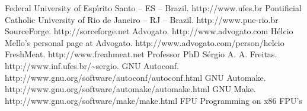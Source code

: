 \documentclass[a4paper,draft,12pt]{book}
\begin{document}
\begin{thebibliography}{12}
 Federal University of Esp\'{\i}rito Santo -- ES -- Brazil.
http://www.ufes.br
 Pontificial Catholic University of Rio de Janeiro -- RJ
-- Brazil. http://www.puc-rio.br
 SourceForge. http://sorceforge.net
Advogato. http://www.advogato.com
H\'elcio Mello's personal page at Advogato.
http://www.advogato.com/person/helcio
FreshMeat. http://www.freahmeat.net
Professor PhD S\'ergio A. A. Freitas.
http://www.inf.ufes.br/\~{}sergio.
GNU Autoconf.
http://www.gnu.org/software/autoconf/autoconf.html
GNU Automake.
http://www.gnu.org/software/automake/automake.html
GNU Make. http://www.gnu.org/software/make/make.html
FPU Programming on x86 FPU's
\end{thebibliography}
\end{document}
